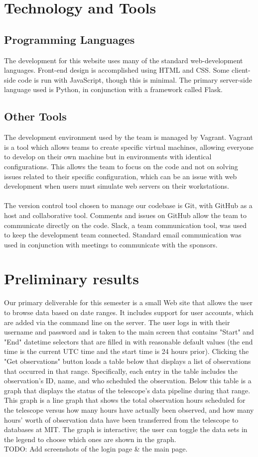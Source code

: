 \documentclass[12pt]{article}
\begin{document}
\begin{spacing}{1.5}
\section{Technology and Tools}
\subsection{Programming Languages}
The development for this website uses many of the standard web-development languages. Front-end design is accomplished using HTML and CSS. Some client-side code is run with JavaScript, though this is minimal. The primary server-side language used is Python, in conjunction with a framework called Flask. 

\subsection{Other Tools}
The development environment used by the team is managed by Vagrant. Vagrant is a tool which allows teams to create specific virtual machines, allowing everyone to develop on their own machine but in environments with identical configurations. This allows the team to focus on the code and not on solving issues related to their specific configuration, which can be an issue with web development when users must simulate web servers on their workstations.
\\ \\
The version control tool chosen to manage our codebase is Git, with GitHub as a host and collaborative tool. Comments and issues on GitHub allow the team to communicate directly on the code. Slack, a team communication tool, was used to keep the development team connected. Standard email communication was used in conjunction with meetings to communicate with the sponsors.

\section{Preliminary results}
Our primary deliverable for this semester is a small Web site that allows the user to browse data based on date ranges. It includes support for user accounts, which are added via the command line on the server. The user logs in with their username and password and is taken to the main screen that contains "Start" and "End" datetime selectors that are filled in with reasonable default values (the end time is the current UTC time and the start time is 24 hours prior). Clicking the "Get observations" button loads a table below that displays a list of observations that occurred in that range. Specifically, each entry in the table includes the observation's ID, name, and who scheduled the observation. Below this table is a graph that displays the status of the telescope's data pipeline during that range. This graph is a line graph that shows the total observation hours scheduled for the telescope versus how many hours have actually been observed, and how many hours' worth of observation data have been transferred from the telescope to databases at MIT. The graph is interactive; the user can toggle the data sets in the legend to choose which ones are shown in the graph.
\\
TODO: Add screenshots of the login page \& the main page.

\end{spacing}
\end{document}
